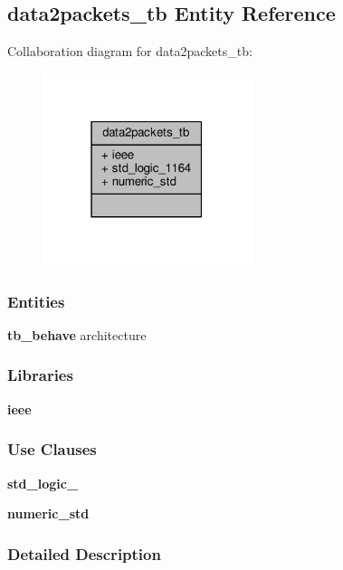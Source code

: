 \subsection{data2packets\+\_\+tb Entity Reference}
\label{classdata2packets__tb}


Collaboration diagram for data2packets\+\_\+tb\+:\nopagebreak
\begin{figure}[H]
\begin{center}
\leavevmode
\includegraphics[width=171pt]{d3/d8c/classdata2packets__tb__coll__graph}
\end{center}
\end{figure}
\subsubsection*{Entities}
\begin{DoxyCompactItemize}
\item 
{\bf tb\+\_\+behave} architecture
\end{DoxyCompactItemize}
\subsubsection*{Libraries}
 \begin{DoxyCompactItemize}
\item 
{\bf ieee} 
\end{DoxyCompactItemize}
\subsubsection*{Use Clauses}
 \begin{DoxyCompactItemize}
\item 
{\bf std\+\_\+logic\+\_}   
\item 
{\bf numeric\+\_\+std}   
\end{DoxyCompactItemize}


\subsubsection{Detailed Description}


